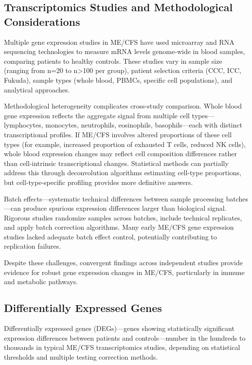 \subsection{Transcriptomics Studies and Methodological Considerations}

Multiple gene expression studies in ME/CFS have used microarray and RNA sequencing technologies to measure mRNA levels genome-wide in blood samples, comparing patients to healthy controls. These studies vary in sample size (ranging from n=20 to n>100 per group), patient selection criteria (CCC, ICC, Fukuda), sample types (whole blood, PBMCs, specific cell populations), and analytical approaches.

Methodological heterogeneity complicates cross-study comparison. Whole blood gene expression reflects the aggregate signal from multiple cell types---lymphocytes, monocytes, neutrophils, eosinophils, basophils---each with distinct transcriptional profiles. If ME/CFS involves altered proportions of these cell types (for example, increased proportion of exhausted T cells, reduced NK cells), whole blood expression changes may reflect cell composition differences rather than cell-intrinsic transcriptional changes. Statistical methods can partially address this through deconvolution algorithms estimating cell-type proportions, but cell-type-specific profiling provides more definitive answers.

Batch effects---systematic technical differences between sample processing batches---can produce spurious expression differences larger than biological signal. Rigorous studies randomize samples across batches, include technical replicates, and apply batch correction algorithms. Many early ME/CFS gene expression studies lacked adequate batch effect control, potentially contributing to replication failures.

Despite these challenges, convergent findings across independent studies provide evidence for robust gene expression changes in ME/CFS, particularly in immune and metabolic pathways.

\subsection{Differentially Expressed Genes}

Differentially expressed genes (DEGs)---genes showing statistically significant expression differences between patients and controls---number in the hundreds to thousands in typical ME/CFS transcriptomics studies, depending on statistical thresholds and multiple testing correction methods.


